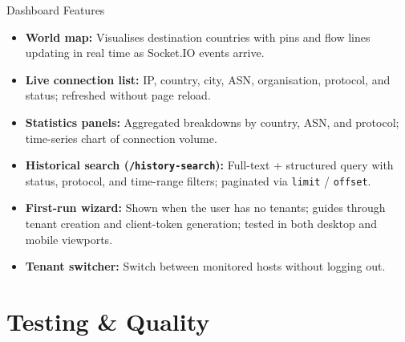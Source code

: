 \documentclass[aspectratio=169]{beamer}
\begin{document}
\begin{frame}{Dashboard Features}
    \begin{itemize}
        \item \textbf{World map:} Visualises destination countries with pins and flow lines
              updating in real time as Socket.IO events arrive.
        \item \textbf{Live connection list:} IP, country, city, ASN, organisation, protocol,
              and status; refreshed without page reload.
        \item \textbf{Statistics panels:} Aggregated breakdowns by country, ASN, and
              protocol; time-series chart of connection volume.
        \item \textbf{Historical search (\texttt{/history-search}):} Full-text + structured
              query with status, protocol, and time-range filters; paginated via
              \texttt{limit} / \texttt{offset}.
        \item \textbf{First-run wizard:} Shown when the user has no tenants; guides through
              tenant creation and client-token generation; tested in both desktop and mobile
              viewports.
        \item \textbf{Tenant switcher:} Switch between monitored hosts without logging out.
    \end{itemize}
\end{frame}

\section{Testing \& Quality}
\end{document}
